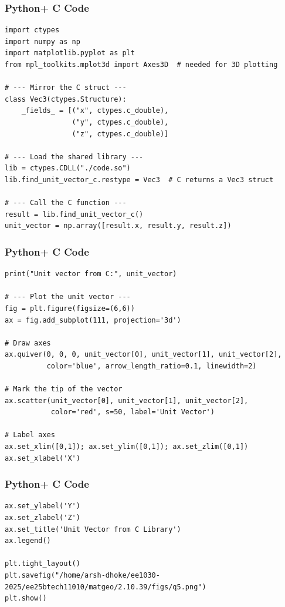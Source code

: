 \documentclass{beamer}
\begin{document}
\begin{frame}[fragile]
    \frametitle{Python+ C Code}
\begin{lstlisting}
import ctypes
import numpy as np
import matplotlib.pyplot as plt
from mpl_toolkits.mplot3d import Axes3D  # needed for 3D plotting

# --- Mirror the C struct ---
class Vec3(ctypes.Structure):
    _fields_ = [("x", ctypes.c_double),
                ("y", ctypes.c_double),
                ("z", ctypes.c_double)]

# --- Load the shared library ---
lib = ctypes.CDLL("./code.so")
lib.find_unit_vector_c.restype = Vec3  # C returns a Vec3 struct

# --- Call the C function ---
result = lib.find_unit_vector_c()
unit_vector = np.array([result.x, result.y, result.z])
\end{lstlisting}
\end{frame}

\begin{frame}[fragile]
    \frametitle{Python+ C Code}
\begin{lstlisting}
print("Unit vector from C:", unit_vector)

# --- Plot the unit vector ---
fig = plt.figure(figsize=(6,6))
ax = fig.add_subplot(111, projection='3d')

# Draw axes
ax.quiver(0, 0, 0, unit_vector[0], unit_vector[1], unit_vector[2],
          color='blue', arrow_length_ratio=0.1, linewidth=2)

# Mark the tip of the vector
ax.scatter(unit_vector[0], unit_vector[1], unit_vector[2],
           color='red', s=50, label='Unit Vector')

# Label axes
ax.set_xlim([0,1]); ax.set_ylim([0,1]); ax.set_zlim([0,1])
ax.set_xlabel('X')
\end{lstlisting}
\end{frame}


\begin{frame}[fragile]
    \frametitle{Python+ C Code}
\begin{lstlisting}
ax.set_ylabel('Y')
ax.set_zlabel('Z')
ax.set_title('Unit Vector from C Library')
ax.legend()

plt.tight_layout()
plt.savefig("/home/arsh-dhoke/ee1030-2025/ee25btech11010/matgeo/2.10.39/figs/q5.png")
plt.show()

\end{lstlisting}
\end{frame}
\end{document}

